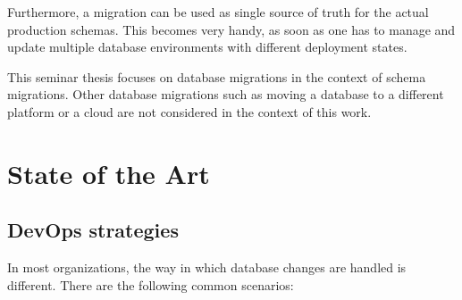 Furthermore, a migration can be used as single source of truth for the actual production schemas. This becomes very handy, as soon as one has to manage and update multiple database environments with different deployment states.

%
This seminar thesis focuses on database migrations in the context of schema migrations.  Other database migrations such as moving a database to a different platform or a cloud are not considered in the context of this work.

\newpage
\section{State of the Art}%
\subsection{DevOps strategies}
%
In most organizations, the way in which database changes are handled is different. There are the following common scenarios:

